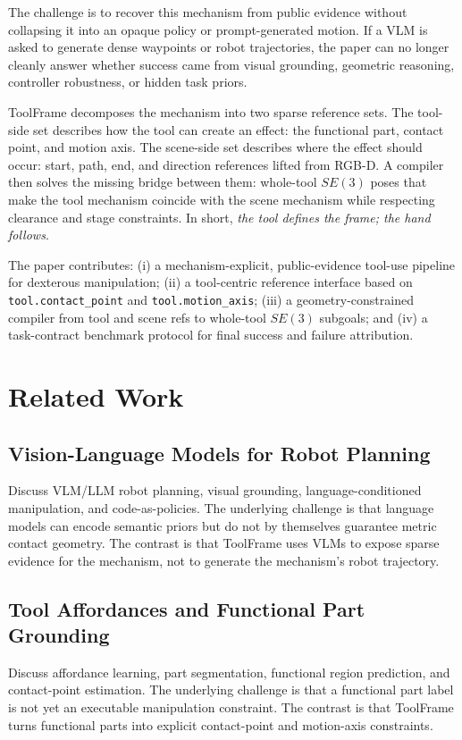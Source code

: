 \documentclass[letterpaper, 10 pt, journal, twoside]{IEEEtran}
\newcommand{\method}{ToolFrame}
\begin{document}
The challenge is to recover this mechanism from public evidence without
collapsing it into an opaque policy or prompt-generated motion. If a VLM is
asked to generate dense waypoints or robot trajectories, the paper can no
longer cleanly answer whether success came from visual grounding, geometric
reasoning, controller robustness, or hidden task priors.

\method{} decomposes the mechanism into two sparse reference sets. The
tool-side set describes how the tool can create an effect: the functional part,
contact point, and motion axis. The scene-side set describes where the effect
should occur: start, path, end, and direction references lifted from RGB-D. A
compiler then solves the missing bridge between them: whole-tool $SE(3)$ poses
that make the tool mechanism coincide with the scene mechanism while respecting
clearance and stage constraints. In short, \emph{the tool defines the frame;
the hand follows}.

The paper contributes: (i) a mechanism-explicit, public-evidence tool-use
pipeline for dexterous manipulation; (ii) a tool-centric reference interface
based on \texttt{tool.contact\_point} and \texttt{tool.motion\_axis}; (iii) a
geometry-constrained compiler from tool and scene refs to whole-tool $SE(3)$
subgoals; and (iv) a task-contract benchmark protocol for final success and
failure attribution.

\section{Related Work}
\subsection{Vision-Language Models for Robot Planning}
Discuss VLM/LLM robot planning, visual grounding, language-conditioned
manipulation, and code-as-policies. The underlying challenge is that language
models can encode semantic priors but do not by themselves guarantee metric
contact geometry. The contrast is that \method{} uses VLMs to expose sparse
evidence for the mechanism, not to generate the mechanism's robot trajectory.

\subsection{Tool Affordances and Functional Part Grounding}
Discuss affordance learning, part segmentation, functional region prediction,
and contact-point estimation. The underlying challenge is that a functional
part label is not yet an executable manipulation constraint. The contrast is
that \method{} turns functional parts into explicit contact-point and
motion-axis constraints.
\end{document}
